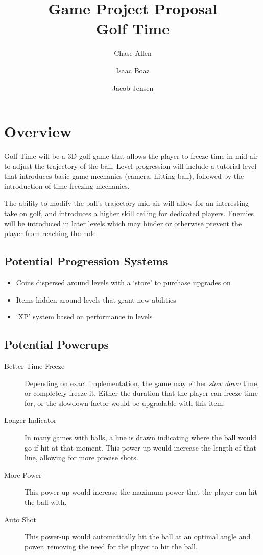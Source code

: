 \documentclass{article}
\title{Game Project Proposal \\ \LARGE Golf Time}
\author{Chase Allen \and Isaac Boaz \and Jacob Jensen}
\begin{document}
\maketitle

\section*{Overview}
Golf Time will be a 3D golf game that allows the player to freeze time in
mid-air to adjust the trajectory of the ball. Level progression will include a
tutorial level that introduces basic game mechanics (camera, hitting ball),
followed by the introduction of time freezing mechanics.

The ability to modify the ball's trajectory mid-air will allow for an
interesting take on golf, and introduces a higher skill ceiling for dedicated
players. Enemies will be introduced in later levels which may hinder or otherwise prevent
the player from reaching the hole.

\subsection*{Potential Progression Systems}
\begin{itemize}
    \setlength{\itemsep}{0.2em}
    \item Coins dispersed around levels with a `store' to purchase upgrades on
    \item Items hidden around levels that grant new abilities
    \item `XP' system based on performance in levels
\end{itemize}

\subsection*{Potential Powerups}
\begin{description}
    \item[Better Time Freeze] Depending on exact implementation, the game may
          either \emph{slow down} time, or completely freeze it. Either the duration
          that the player can freeze time for, or the slowdown factor would be
          upgradable with this item.
    \item[Longer Indicator] In many games with balls, a line is drawn indicating where the
          ball would go if hit at that moment. This power-up would increase the length
          of that line, allowing for more precise shots.
    \item[More Power] This power-up would increase the maximum power that the
          player can hit the ball with.
    \item[Auto Shot] This power-up would automatically hit the ball at an optimal
          angle and power, removing the need for the player to hit the ball.
\end{description}
\end{document}
